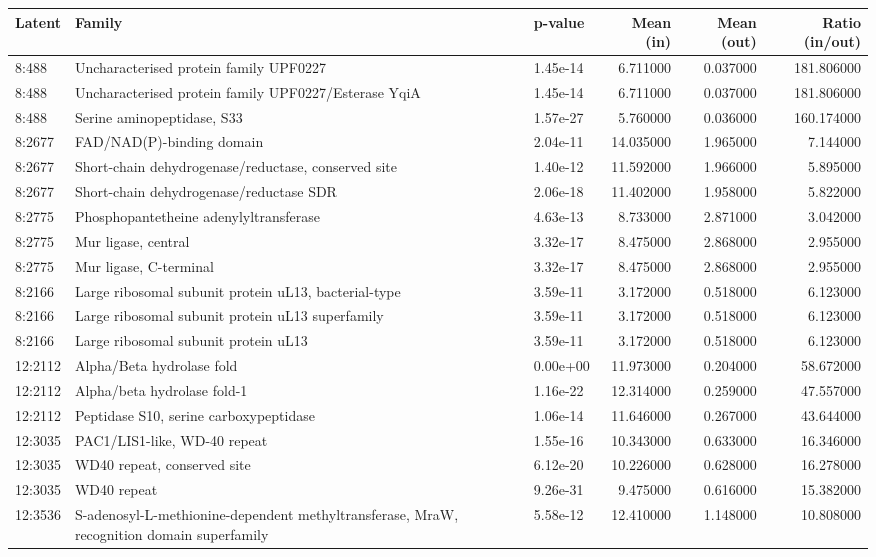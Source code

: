 \begin{tabular}{|l|l|l|r|r|r|}
\hline
Latent & Family & p-value & Mean (in) & Mean (out) & Ratio (in/out) \\
\hline
8:488 & Uncharacterised protein family UPF0227 & 1.45e-14 & 6.711000 & 0.037000 & 181.806000 \\
8:488 & Uncharacterised protein family UPF0227/Esterase YqiA & 1.45e-14 & 6.711000 & 0.037000 & 181.806000 \\
8:488 & Serine aminopeptidase, S33 & 1.57e-27 & 5.760000 & 0.036000 & 160.174000 \\
8:2677 & FAD/NAD(P)-binding domain & 2.04e-11 & 14.035000 & 1.965000 & 7.144000 \\
8:2677 & Short-chain dehydrogenase/reductase, conserved site & 1.40e-12 & 11.592000 & 1.966000 & 5.895000 \\
8:2677 & Short-chain dehydrogenase/reductase SDR & 2.06e-18 & 11.402000 & 1.958000 & 5.822000 \\
8:2775 & Phosphopantetheine adenylyltransferase & 4.63e-13 & 8.733000 & 2.871000 & 3.042000 \\
8:2775 & Mur ligase, central & 3.32e-17 & 8.475000 & 2.868000 & 2.955000 \\
8:2775 & Mur ligase, C-terminal & 3.32e-17 & 8.475000 & 2.868000 & 2.955000 \\
8:2166 & Large ribosomal subunit protein uL13, bacterial-type & 3.59e-11 & 3.172000 & 0.518000 & 6.123000 \\
8:2166 & Large ribosomal subunit protein uL13 superfamily & 3.59e-11 & 3.172000 & 0.518000 & 6.123000 \\
8:2166 & Large ribosomal subunit protein uL13 & 3.59e-11 & 3.172000 & 0.518000 & 6.123000 \\
12:2112 & Alpha/Beta hydrolase fold & 0.00e+00 & 11.973000 & 0.204000 & 58.672000 \\
12:2112 & Alpha/beta hydrolase fold-1 & 1.16e-22 & 12.314000 & 0.259000 & 47.557000 \\
12:2112 & Peptidase S10, serine carboxypeptidase & 1.06e-14 & 11.646000 & 0.267000 & 43.644000 \\
12:3035 & PAC1/LIS1-like, WD-40 repeat & 1.55e-16 & 10.343000 & 0.633000 & 16.346000 \\
12:3035 & WD40 repeat, conserved site & 6.12e-20 & 10.226000 & 0.628000 & 16.278000 \\
12:3035 & WD40 repeat & 9.26e-31 & 9.475000 & 0.616000 & 15.382000 \\
12:3536 & S-adenosyl-L-methionine-dependent methyltransferase, MraW, recognition domain superfamily & 5.58e-12 & 12.410000 & 1.148000 & 10.808000 \\

\end{tabular}
